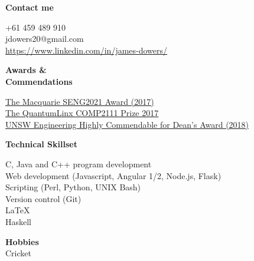 \documentclass[a4paper]{article}
\newcommand{\mytitle}[1]{{\Large \textbf{#1}} \vspace{0.2cm}}
\begin{document}
\begin{minipage}[t]{0.3\linewidth}
    {
        \mytitle{Contact me}
        
        +61 459 489 910 \\
        jdowers20@gmail.com \\
        \href{https://www.linkedin.com/in/james-dowers-823780116/}{https://www.linkedin.com/in/james-dowers/} 

    }
    \vspace{0.5cm}

    {
        \mytitle{Awards \&\\ Commendations}

        \href{https://www.engineering.unsw.edu.au/computer-science-engineering/computer-science-engineering/computer-science-engineering/computer-science-engineering/2017-winners}{The Macquarie SENG2021 Award (2017)} \\
        
        \href{https://www.engineering.unsw.edu.au/computer-science-engineering/computer-science-engineering/computer-science-engineering/computer-science-engineering/2017-winners}{The QuantumLinx COMP2111 Prize 2017}\\
        
        \href{https://www.engineering.unsw.edu.au/study-with-us/current-students/academic-information/awards-prizes/dean%E2%80%99s-honours-list/current-deans}{UNSW Engineering Highly Commendable for Dean's Award (2018)} \\
    }
    \vspace{0.5cm}
    
    {
        \mytitle{Technical Skillset}

        C, Java and C++ program development \\ 

        Web development (Javascript, Angular 1/2, Node.js, Flask) \\

        Scripting (Perl, Python, UNIX Bash) \\

        Version control (Git) \\

        {\large \LaTeX} \\
        
        Haskell
    }

    \vspace{0.5cm}
    {
        \mytitle{Hobbies}\\
        Cricket \\
    }


\end{minipage}
\end{document}
